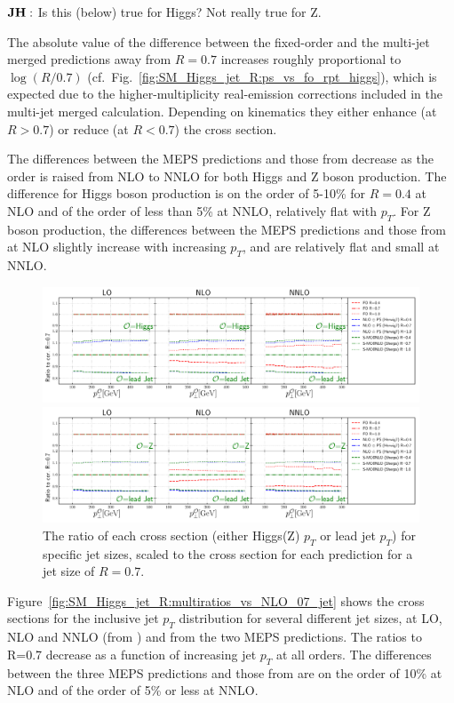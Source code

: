 \documentclass[aps,prd,onecolumn,fleqn,superscriptaddress,groupedaddress,nofootinbib,preprintnumbers,nobalancelastpage]{revtex4}
\begin{document}
$\bf JH:$ Is this (below) true for Higgs? Not really true for Z. 

The absolute value of the
difference between the fixed-order and the multi-jet merged predictions away
from $R=0.7$ increases roughly proportional to $\log (R/0.7)$
(cf.\ Fig.~\ref{fig:SM_Higgs_jet_R:ps_vs_fo_rpt_higgs}), which is expected due to the
higher-multiplicity real-emission corrections included in the multi-jet merged
calculation. Depending on kinematics they either enhance (at $R>0.7$) or reduce
(at $R<0.7$) the cross section.  

The differences between the MEPS predictions
and those from \nnlojet decrease as the order is raised from NLO to NNLO for both Higgs and Z boson production.  The
difference for Higgs boson production is on the order of 5-10\% for $R=0.4$ at NLO and of the order of less than 5\% at NNLO, relatively flat with $p_T$. For Z boson production, the differences between the MEPS predictions and those from \nnlojet at NLO slightly increase with
increasing $p_T$, and are relatively flat and small at NNLO. 


\begin{figure}[t]
  \centerline{\includegraphics[width=\textwidth]{plots/Fig_V_18_Higgs.pdf}}
  \centerline{\includegraphics[width=\textwidth]{plots/Fig_V_18_Z.pdf}}
  \caption{The ratio of each cross section (either Higgs(Z) $p_T$ or lead
    jet $p_T$) for specific jet sizes, scaled to the cross section for
    each prediction for a jet size of
    $R=0.7$.  \label{fig:SM_Higgs_jet_R:multiratios_vs_NLO_07}}
\end{figure}

Figure~\ref{fig:SM_Higgs_jet_R:multiratios_vs_NLO_07_jet} shows the cross sections for the inclusive jet $p_T$ distribution for several
different jet sizes, at LO, NLO and NNLO (from \nnlojet) and from the two MEPS
predictions. The ratios to R=0.7 decrease as a function of increasing jet $p_T$ at all orders. 
The differences between the three MEPS predictions and those from \nnlojet are on the order of 10\% at NLO and of the order of 5\% or less at NNLO. 
\end{document}
